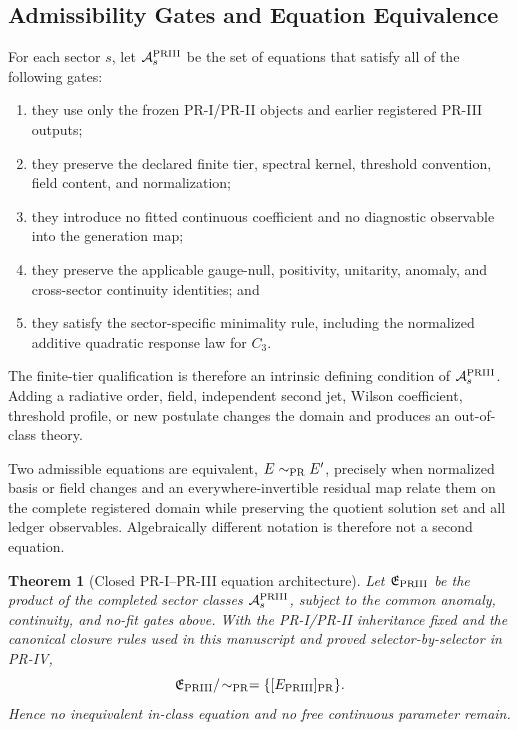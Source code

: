 \documentclass[11pt]{article}
\newtheorem{theorem}{Theorem}[section]
\begin{document}
\subsection{Admissibility Gates and Equation Equivalence}
\label{subsec:priii-closed-admissibility-gates}

For each sector \(s\), let \(\mathcal A_s^{\rm PRIII}\) be the set of equations
that satisfy all of the following gates:
\begin{enumerate}
  \item they use only the frozen PR-I/PR-II objects and earlier registered
  PR-III outputs;
  \item they preserve the declared finite tier, spectral kernel, threshold
  convention, field content, and normalization;
  \item they introduce no fitted continuous coefficient and no diagnostic
  observable into the generation map;
  \item they preserve the applicable gauge-null, positivity, unitarity,
  anomaly, and cross-sector continuity identities; and
  \item they satisfy the sector-specific minimality rule, including the
  normalized additive quadratic response law for \(C_3\).
\end{enumerate}
The finite-tier qualification is therefore an intrinsic defining condition of \(\mathcal A_s^{\rm PRIII}\).  Adding a radiative order, field, independent second jet, Wilson coefficient, threshold profile, or new postulate changes the domain and produces an out-of-class theory.

Two admissible equations are equivalent, \(E\sim_{\rm PR}E'\), precisely when normalized basis or field changes and an everywhere-invertible residual map relate them on the complete registered domain while preserving the quotient solution set and all ledger observables.  Algebraically different notation is therefore not a second equation.

\begin{theorem}[Closed PR-I--PR-III equation architecture]
\label{thm:priii-closed-equation-architecture}
Let \(\mathfrak E_{\rm PRIII}\) be the product of the completed sector classes \(\mathcal A_s^{\rm PRIII}\), subject to the common anomaly, continuity, and no-fit gates above.  With the PR-I/PR-II inheritance fixed and the canonical closure rules used in this manuscript and proved selector-by-selector in
PR-IV,
\begin{equation}
\mathfrak E_{\rm PRIII}/\!\sim_{\rm PR}
=
\{[E_{\rm PRIII}]_{\rm PR}\}.
\label{eq:priii-architecture-singleton}
\end{equation}
Hence no inequivalent in-class equation and no free continuous parameter
remain.
\end{theorem}
\end{document}
